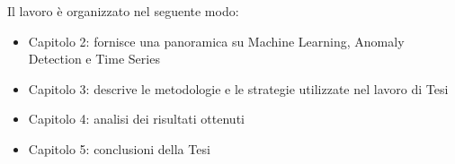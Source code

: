 \vspace{1cm}

Il lavoro \`e organizzato nel seguente modo:
\begin{itemize}

  \item Capitolo 2: fornisce una panoramica su Machine Learning, Anomaly Detection e Time Series
  
  \item Capitolo 3: descrive le metodologie e le strategie utilizzate nel lavoro di Tesi

  \item Capitolo 4: analisi dei risultati ottenuti

  \item Capitolo 5: conclusioni della Tesi
  
\end{itemize}

\vspace{-0.5cm}
\vspace{-0.3cm}
